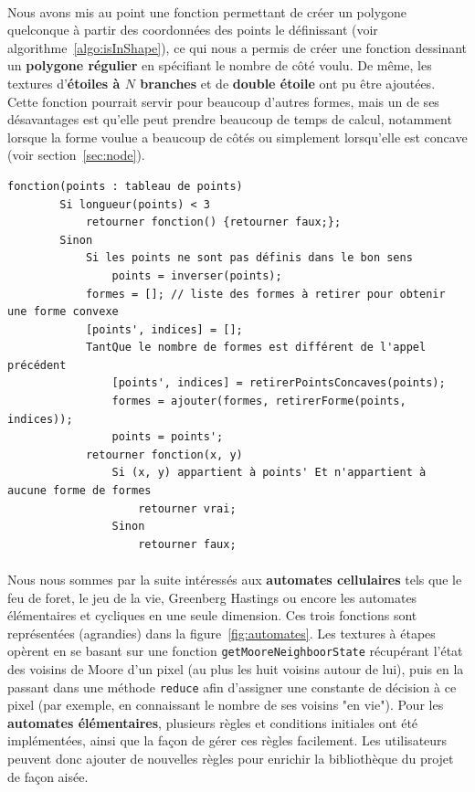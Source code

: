 \documentclass[a4paper]{article}
\begin{document}
\paragraph{}
Nous avons mis au point une fonction permettant de créer un polygone quelconque à partir des coordonnées des points le définissant (voir algorithme~\ref{algo:isInShape}), ce qui nous a permis de créer une fonction dessinant un \textbf{polygone régulier} en spécifiant le nombre de côté voulu. De même, les textures d'\textbf{étoiles à $N$ branches} et de \textbf{double étoile} ont pu être ajoutées. Cette fonction pourrait servir pour beaucoup d'autres formes, mais un de ses désavantages est qu'elle peut prendre beaucoup de temps de calcul, notamment lorsque la forme voulue a beaucoup de côtés ou simplement lorsqu'elle est concave (voir section~\ref{sec:node}). 

\begin{lstlisting}[caption ={Fonction déterminant l'appartenance d'un point à une forme}, label=algo:isInShape, float=h]
    fonction(points : tableau de points)
        Si longueur(points) < 3
            retourner fonction() {retourner faux;};
        Sinon
            Si les points ne sont pas définis dans le bon sens
                points = inverser(points);
            formes = []; // liste des formes à retirer pour obtenir une forme convexe
            [points', indices] = [];
            TantQue le nombre de formes est différent de l'appel précédent
                [points', indices] = retirerPointsConcaves(points);
                formes = ajouter(formes, retirerForme(points, indices));
                points = points';
            retourner fonction(x, y) 
                Si (x, y) appartient à points' Et n'appartient à aucune forme de formes
                    retourner vrai;
                Sinon 
                    retourner faux;
\end{lstlisting}

\paragraph{}
Nous nous sommes par la suite intéressés aux \textbf{automates cellulaires} tels que le feu de foret, le jeu de la vie\cite{goL}, Greenberg Hastings ou encore les automates élémentaires et cycliques en une seule dimension. Ces trois fonctions sont représentées (agrandies) dans la figure~\ref{fig:automates}. Les textures à étapes opèrent en se basant sur une fonction \texttt{getMooreNeighboorState} récupérant l'état des voisins de Moore\cite{moore} d'un pixel (au plus les huit voisins autour de lui), puis en la passant dans une méthode \texttt{reduce} afin d'assigner une constante de décision à ce pixel (par exemple, en connaissant le nombre de ses voisins "en vie"). Pour les \textbf{automates élémentaires}\cite{elemCellu}, plusieurs règles et conditions initiales ont été implémentées, ainsi que la façon de gérer ces règles facilement. Les utilisateurs peuvent donc ajouter de nouvelles règles pour enrichir la bibliothèque du projet de façon aisée.
\end{document}
